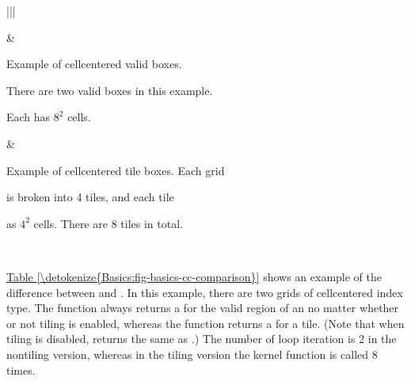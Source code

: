 \documentclass[letterpaper,10pt,english]{sphinxmanual}
\begin{document}
\begin{savenotes}\sphinxattablestart
\centering
{}
\sphinxthecaptionisattop
{}\label{\detokenize{Basics:id3}}\label{\detokenize{Basics:fig-basics-cc-comparison}}
\sphinxaftertopcaption
\begin{tabular}[t]{|*{2}{|}}
\hline

\sphinxAtStartPar
{}
&
\sphinxAtStartPar
{}
\\
\hline
\begin{DUlineblock}{0em}
\item[] Example of cell\sphinxhyphen{}centered valid boxes.
\item[] There are two valid boxes in this example.
\item[] Each has \(8^2\) cells.
\end{DUlineblock}
&
\begin{DUlineblock}{0em}
\item[] Example of cell\sphinxhyphen{}centered tile boxes. Each grid
\item[] is  broken into 4 tiles, and each tile
\item[] as \(4^2\) cells. There are 8 tiles in total.
\end{DUlineblock}
\\
\hline
\end{tabular}
\par
\sphinxattableend\end{savenotes}

\sphinxAtStartPar
\hyperref[\detokenize{Basics:fig-basics-cc-comparison}]{Table \ref{\detokenize{Basics:fig-basics-cc-comparison}}} shows an example of the difference between
 and . In this example, there are two grids of
cell\sphinxhyphen{}centered index type. The function  always returns a
 for the valid region of an  no matter whether or not
tiling is enabled, whereas the function  returns a  for
a tile. (Note that when tiling is disabled,  returns the same
 as .) The number of loop iteration is 2 in the
non\sphinxhyphen{}tiling version, whereas in the tiling version the kernel function is called
8 times.
\end{document}
